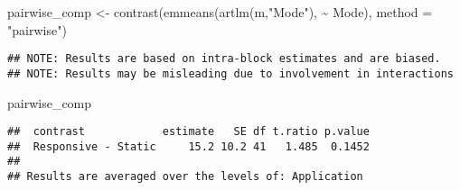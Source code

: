 \documentclass[
]{article}
\newenvironment{Shaded}{\begin{snugshade}}{\end{snugshade}}
\newcommand{\AttributeTok}[1]{\textcolor[rgb]{0.77,0.63,0.00}{#1}}
\newcommand{\FunctionTok}[1]{\textcolor[rgb]{0.00,0.00,0.00}{#1}}
\newcommand{\NormalTok}[1]{#1}
\newcommand{\OtherTok}[1]{\textcolor[rgb]{0.56,0.35,0.01}{#1}}
\newcommand{\SpecialCharTok}[1]{\textcolor[rgb]{0.00,0.00,0.00}{#1}}
\newcommand{\StringTok}[1]{\textcolor[rgb]{0.31,0.60,0.02}{#1}}
\begin{document}
\begin{Shaded}
\begin{Highlighting}[]
\NormalTok{pairwise\_comp }\OtherTok{\textless{}{-}} \FunctionTok{contrast}\NormalTok{(}\FunctionTok{emmeans}\NormalTok{(}\FunctionTok{artlm}\NormalTok{(m,}\StringTok{"Mode"}\NormalTok{), }\SpecialCharTok{\textasciitilde{}}\NormalTok{ Mode), }\AttributeTok{method =} \StringTok{"pairwise"}\NormalTok{)}
\end{Highlighting}
\end{Shaded}

\begin{verbatim}
## NOTE: Results are based on intra-block estimates and are biased.
## NOTE: Results may be misleading due to involvement in interactions
\end{verbatim}

\begin{Shaded}
\begin{Highlighting}[]
\NormalTok{pairwise\_comp}
\end{Highlighting}
\end{Shaded}

\begin{verbatim}
##  contrast            estimate   SE df t.ratio p.value
##  Responsive - Static     15.2 10.2 41   1.485  0.1452
## 
## Results are averaged over the levels of: Application
\end{verbatim}
\end{document}
